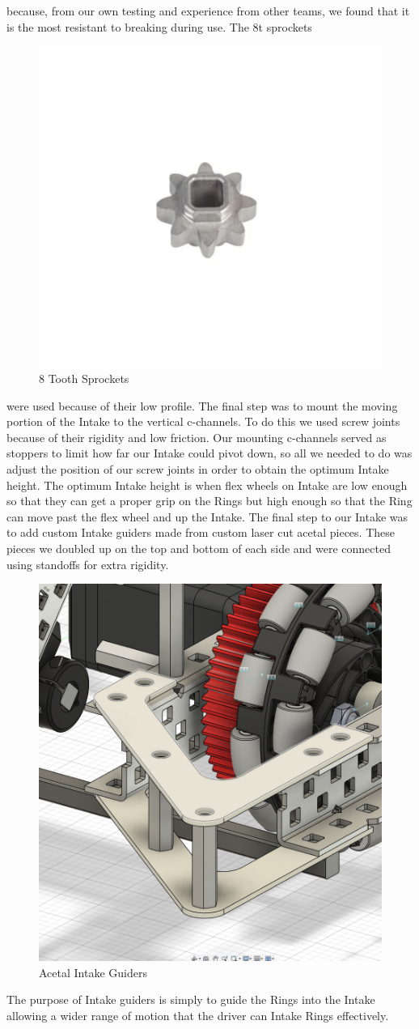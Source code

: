 because, from our own testing and experience from other teams, we found that it is the most resistant to breaking during use. The 8t sprockets 
\begin{figure}[H]
    \centering
    \includegraphics[width=0.5\linewidth]{images/8tsprockets.png}
    \caption{8 Tooth Sprockets}
\end{figure}
were used because of their low profile. The final step was to mount the moving portion of the Intake to the vertical c-channels. To do this we used screw joints because of their rigidity and low friction. Our mounting c-channels served as stoppers to limit how far our Intake could pivot down, so all we needed to do was adjust the position of our screw joints in order to obtain the optimum Intake height. The optimum Intake height is when flex wheels on Intake are low enough so that they can get a proper grip on the Rings but high enough so that the Ring can move past the flex wheel and up the Intake. The final step to our Intake was to add custom Intake guiders made from custom laser cut acetal pieces. These pieces we doubled up on the top and bottom of each side and were connected using standoffs for extra rigidity. 
\begin{figure}[H]
    \centering
    \includegraphics[width=0.5\linewidth]{images/acetalintakeguiders.png}
    \caption{Acetal Intake Guiders}
\end{figure}
The purpose of Intake guiders is simply to guide the Rings into the Intake allowing a wider range of motion that the driver can Intake Rings effectively. 

